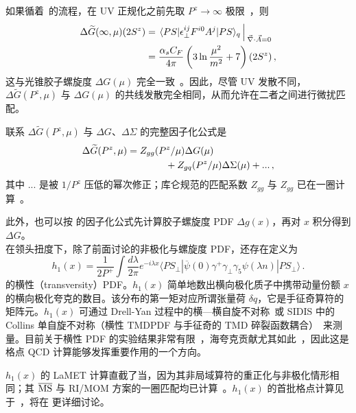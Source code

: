 如果循着~\cite{Weinberg:1966jm}的流程，在 UV 正规化之前先取 $P^z\to\infty$ 极限~\cite{Ji:2013fga}，则
\begin{align} \label{eq:coulombimf}
	\Delta \widetilde{G}(\infty, \mu) (2S^z)&= \left. \langle PS| \epsilon^{ij}_\perp F^{i0}A^j|PS\rangle_q\right\arrowvert_{\vec{\nabla}\cdot \vec{A}=0}\nonumber\\
	&=\frac{\alpha_sC_F}{4\pi}\left(3\ln{\mu^2\over m^2}+7\right) (2S^z)\,,
\end{align}
这与光锥胶子螺旋度 $\Delta G(\mu)$ 完全一致~\cite{Hoodbhoy:1998bt}。因此，尽管 UV 发散不同，$\Delta \widetilde G(P^z,\mu)$ 与 $\Delta G(\mu)$ 的共线发散完全相同，从而允许在二者之间进行微扰匹配。

联系 $\Delta\widetilde G(P^z,\mu)$ 与 $\Delta G$、$\Delta \Sigma$ 的完整因子化公式是
\begin{align} \label{eq:deltaGmatching}
	\Delta\widetilde G(P^z,\mu) &= Z_{gg}(P^z/\mu)\Delta G(\mu) \nonumber\\
	&\qquad\qquad+ Z_{gq}(P^z/\mu)\Delta\Sigma(\mu) +...\,,
\end{align}
其中 $...$ 是被 $1/P^z$ 压低的幂次修正；库仑规范的匹配系数 $Z_{gg}$ 与 $Z_{gg}$ 已在一圈计算~\cite{Ji:2014lra}。

此外，也可以按  的因子化公式先计算胶子螺旋度 PDF $\Delta g(x)$，再对 $x$ 积分得到 $\Delta G$。\\

在领头扭度下，除了前面讨论的非极化与螺旋度 PDF，还存在定义为~\cite{Jaffe:1991kp,Jaffe:1991ra}
\begin{equation}
	h_1(x)\! =\! \frac{1}{2P^+}\!\int \frac{d\lambda}{2\pi}
	e^{-i\lambda x} \langle PS_\perp|\overline{\psi}(0)\gamma^+\gamma_\perp\gamma_5\psi(\lambda n)|PS_\perp\rangle \,.
\end{equation}
的横性（transversity）PDF。$h_1(x)$ 简单地数出横向极化质子中携带动量份额 $x$ 的横向极化夸克的数目。该分布的第一矩对应所谓张量荷 $\delta q$，它是手征奇算符的矩阵元。$h_1(x)$ 可通过 Drell-Yan 过程中的横—横自旋不对称~\cite{Ralston:1979ys,Jaffe:1991kp,Jaffe:1991ra}或 SIDIS 中的 Collins 单自旋不对称（横性 TMDPDF 与手征奇的 TMD 碎裂函数耦合）~\cite{Collins:1992kk}来测量。目前关于横性 PDF 的实验结果非常有限~\cite{Barone:2001sp,Kang:2015msa,Lin:2017stx,Radici:2018iag,Cammarota:2020qcw}，海夸克贡献尤其如此~\cite{Chang:2014jba}，因此这是格点 QCD 计算能够发挥重要作用的一个方向。

$h_1(x)$ 的 LaMET 计算直截了当，因为其非局域算符的重正化与非极化情形相同；其 ${\overline{\rm MS}}$ 与 RI/MOM 方案的一圈匹配均已计算~\cite{Alexandrou:2018eet,Liu:2018hxv}。$h_1(x)$ 的首批格点计算见于~\cite{Chen:2016utp,Alexandrou:2018eet,Liu:2018hxv}，将在  更详细讨论。


